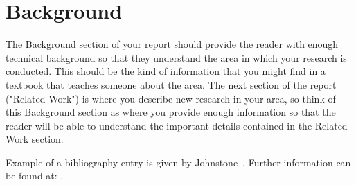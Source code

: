 \section{Background} 

The Background section of your report should provide the reader with enough technical background so that they understand the area in which your research is conducted. This should be the kind of information that you might find in a textbook that teaches someone about the area. The next section of the report ("Related Work") is where you describe new research in your area, so think of this Background section as where you provide enough information so that the reader will be able to understand the important details contained in the Related Work section.


Example of a bibliography entry is given by Johnstone~\cite{Joh11}.
Further information can be found at: \cite{website:fermentas-lambda}.

